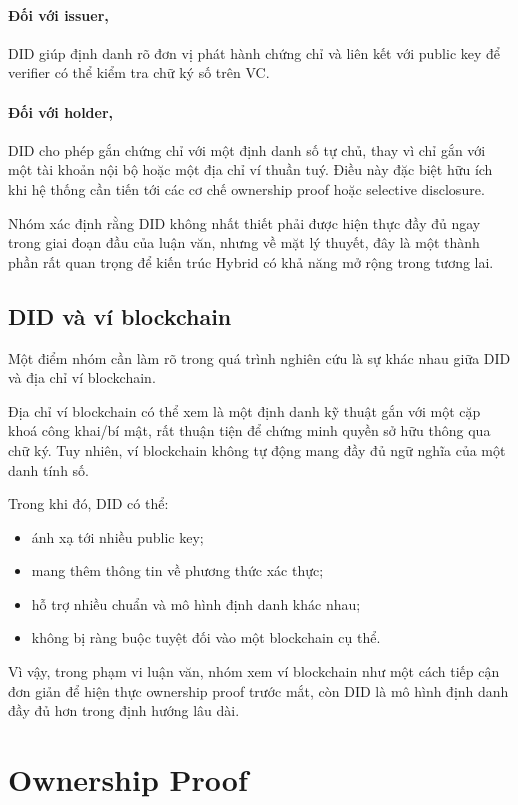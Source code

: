 \paragraph{Đối với issuer,}
DID giúp định danh rõ đơn vị phát hành chứng chỉ và liên kết với public key để verifier có thể kiểm tra chữ ký số trên VC.

\paragraph{Đối với holder,}
DID cho phép gắn chứng chỉ với một định danh số tự chủ, thay vì chỉ gắn với một tài khoản nội bộ hoặc một địa chỉ ví thuần tuý. Điều này đặc biệt hữu ích khi hệ thống cần tiến tới các cơ chế ownership proof hoặc selective disclosure.

Nhóm xác định rằng DID không nhất thiết phải được hiện thực đầy đủ ngay trong giai đoạn đầu của luận văn, nhưng về mặt lý thuyết, đây là một thành phần rất quan trọng để kiến trúc Hybrid có khả năng mở rộng trong tương lai.

\subsection{DID và ví blockchain}

Một điểm nhóm cần làm rõ trong quá trình nghiên cứu là sự khác nhau giữa DID và địa chỉ ví blockchain.

Địa chỉ ví blockchain có thể xem là một định danh kỹ thuật gắn với một cặp khoá công khai/bí mật, rất thuận tiện để chứng minh quyền sở hữu thông qua chữ ký. Tuy nhiên, ví blockchain không tự động mang đầy đủ ngữ nghĩa của một danh tính số.

Trong khi đó, DID có thể:
\begin{itemize}
    \item ánh xạ tới nhiều public key;
    \item mang thêm thông tin về phương thức xác thực;
    \item hỗ trợ nhiều chuẩn và mô hình định danh khác nhau;
    \item không bị ràng buộc tuyệt đối vào một blockchain cụ thể.
\end{itemize}

Vì vậy, trong phạm vi luận văn, nhóm xem ví blockchain như một cách tiếp cận đơn giản để hiện thực ownership proof trước mắt, còn DID là mô hình định danh đầy đủ hơn trong định hướng lâu dài.

\section{Ownership Proof}


